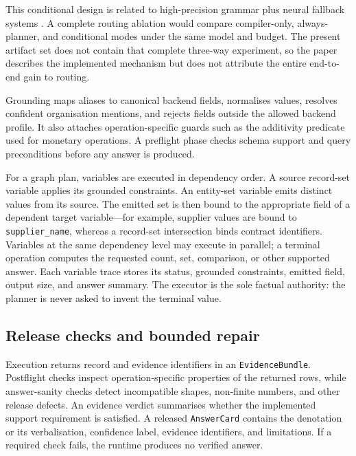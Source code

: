 This conditional design is related to high-precision grammar plus neural fallback systems
\citep{shaw-etal-2021-compositional}.  A complete routing ablation would compare compiler-only,
always-planner, and conditional modes under the same model and budget.  The present artifact set
does not contain that complete three-way experiment, so the paper describes the implemented
mechanism but does not attribute the entire end-to-end gain to routing.

\label{sec:grounding}
Grounding maps aliases to canonical backend fields, normalises values, resolves confident
organisation mentions, and rejects fields outside the allowed backend profile.  It also attaches
operation-specific guards such as the additivity predicate used for monetary operations.  A
preflight phase checks schema support and query preconditions before any answer is produced.

For a graph plan, variables are executed in dependency order.  A source record-set variable
applies its grounded constraints.  An entity-set variable emits distinct values from its source.
The emitted set is then bound to the appropriate field of a dependent target variable---for
example, supplier values are bound to \texttt{supplier\_name}, whereas a record-set
intersection binds contract identifiers.  Variables at the same dependency level may execute in
parallel; a terminal operation computes the requested count, set, comparison, or other supported
answer.  Each variable trace stores its status, grounded constraints, emitted field, output size,
and answer summary.  The executor is the sole factual authority: the planner is never asked to
invent the terminal value.

\subsection{Release checks and bounded repair}
\label{sec:verification}

Execution returns record and evidence identifiers in an \texttt{EvidenceBundle}.  Postflight
checks inspect operation-specific properties of the returned rows, while answer-sanity checks
detect incompatible shapes, non-finite numbers, and other release defects.  An evidence verdict
summarises whether the implemented support requirement is satisfied.  A released
\texttt{AnswerCard} contains the denotation or its verbalisation, confidence label, evidence
identifiers, and limitations.  If a required check fails, the runtime produces no verified
answer.

